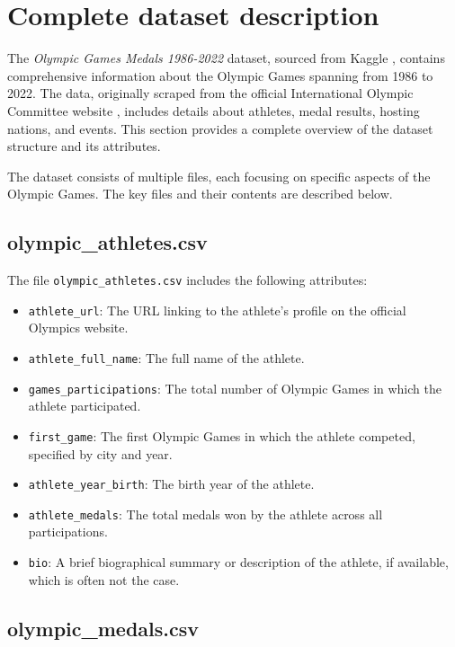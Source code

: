 \chapter{Complete dataset description} \label{app:A}

The \textit{Olympic Games Medals 1986-2022} dataset, sourced from Kaggle \cite{olympic_19862022}, contains comprehensive information about the Olympic Games spanning from 1986 to 2022. The data, originally scraped from the official International Olympic Committee website \cite{olympics}, includes details about athletes, medal results, hosting nations, and events. This section provides a complete overview of the dataset structure and its attributes.

The dataset consists of multiple files, each focusing on specific aspects of the Olympic Games. The key files and their contents are described below.

\section{olympic\_athletes.csv}

The file \texttt{olympic\_athletes.csv} includes the following attributes:

\begin{itemize}
    \item \texttt{athlete\_url}: The URL linking to the athlete's profile on the official Olympics website.
    \item \texttt{athlete\_full\_name}: The full name of the athlete.
    \item \texttt{games\_participations}: The total number of Olympic Games in which the athlete participated.
    \item \texttt{first\_game}: The first Olympic Games in which the athlete competed, specified by city and year.
    \item \texttt{athlete\_year\_birth}: The birth year of the athlete.
    \item \texttt{athlete\_medals}: The total medals won by the athlete across all participations.
    \item \texttt{bio}: A brief biographical summary or description of the athlete, if available, which is often not the case.
\end{itemize}

\section{olympic\_medals.csv}

